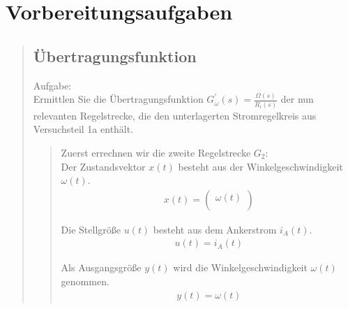 \section{Vorbereitungsaufgaben}
\begin{quote}
	\hspace{-2em}
	\subsection{Übertragungsfunktion}
    Aufgabe:\\
    Ermittlen Sie die Übertragungsfunktion $G_\omega^{'} (s) = \frac{\Omega(s)}{R_i (s)}$ der nun relevanten
    Regelstrecke, die den unterlagerten Stromregelkreis aus Versuchsteil 1a enthält.\\
	\begin{quote}
	   Zuerst errechnen wir die zweite Regelstrecke $G_2$:\\
	   Der Zustandsvektor $x(t)$ besteht aus der Winkelgeschwindigkeit $\omega(t)$.
        \begin{equation*}
            \begin{split}
                x(t) = 
                    \begin {pmatrix}
                        \omega(t)\\
                    \end{pmatrix}
            \end{split}
        \end{equation*}
        
        Die Stellgröße $u(t)$ besteht aus dem Ankerstrom $i_A(t)$.
        \begin{equation*}
            \begin{split}
                u(t) = i_A (t)
            \end{split}
        \end{equation*}
        
        Als Ausgangsgröße $y(t)$ wird die Winkelgeschwindigkeit $\omega(t)$ genommen.
        \begin{equation*}
            \begin{split}
                y(t) = \omega(t)
            \end{split}
        \end{equation*}
        

\end{quote}
\end{quote}
